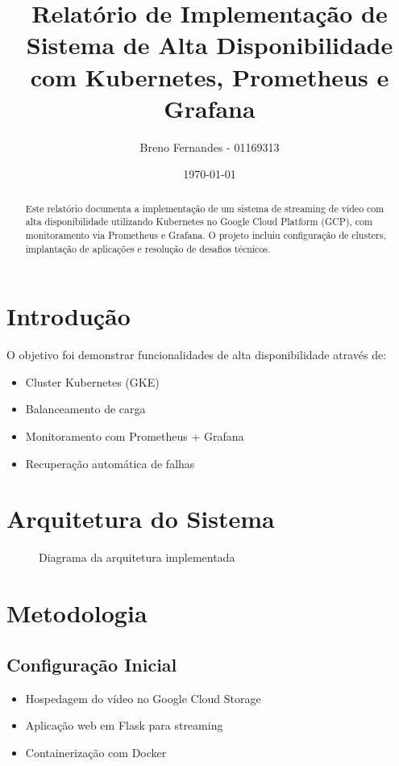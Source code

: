 \documentclass[12pt, a4paper]{article}
\title{Relatório de Implementação de Sistema de Alta Disponibilidade com Kubernetes, Prometheus e Grafana}
\author{Breno Fernandes - 01169313}
\date{\today}
\begin{document}
\maketitle

\begin{abstract}
Este relatório documenta a implementação de um sistema de streaming de vídeo com alta disponibilidade utilizando Kubernetes no Google Cloud Platform (GCP), com monitoramento via Prometheus e Grafana. O projeto incluiu configuração de clusters, implantação de aplicações e resolução de desafios técnicos.
\end{abstract}

\section{Introdução}
O objetivo foi demonstrar funcionalidades de alta disponibilidade através de:
\begin{itemize}
    \item Cluster Kubernetes (GKE)
    \item Balanceamento de carga
    \item Monitoramento com Prometheus + Grafana
    \item Recuperação automática de falhas
\end{itemize}

\section{Arquitetura do Sistema}
\begin{figure}[h]
    \centering
    \caption{Diagrama da arquitetura implementada}
    \label{fig:arquitetura}
\end{figure}

\section{Metodologia}

\subsection{Configuração Inicial}
\begin{itemize}
    \item Hospedagem do vídeo no Google Cloud Storage
    \item Aplicação web em Flask para streaming
    \item Containerização com Docker
\end{itemize}
\end{document}
